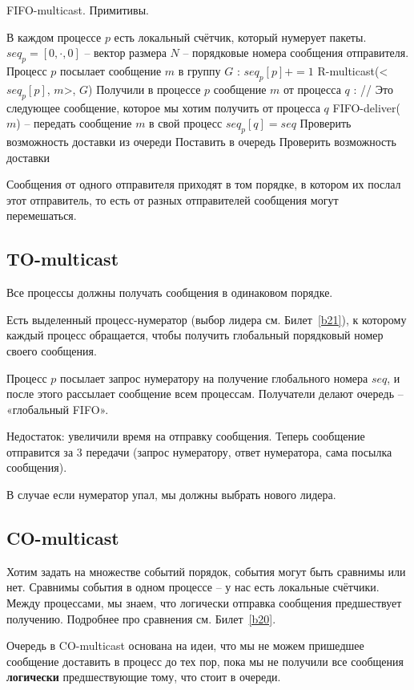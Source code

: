 \begin{algorithm}
\caption{FIFO-multicast. Примитивы.}
\begin{algorithmic}

\State В каждом процессе $p$ есть локальный счётчик, который нумерует пакеты.
\State $seq_p = [0, \cdot, 0]$ -- вектор размера $N$ -- порядковые номера сообщения отправителя.
\State
\State Процесс $p$ посылает сообщение $m$ в группу $G$
:
	\State $seq_p[p] += 1$
	\State R-multicast(<$seq_p[p]$, $m$>, $G$)
\EndProcedure
\State
\State Получили в процессе $p$ сообщение $m$ от процесса $q$
:
		\State // Это следующее сообщение, которое мы хотим получить от процесса $q$
		\State FIFO-deliver($m$) -- передать сообщение $m$ в свой процесс
		\State $seq_p[q] = seq$
		\State Проверить возможность доставки из очереди
	\Else
		\State Поставить в очередь
		\State Проверить возможность доставки
	\EndIf
\EndProcedure

\end{algorithmic}
\end{algorithm}

Сообщения от одного отправителя приходят в том порядке, в котором их послал этот отправитель, то есть от разных отправителей сообщения могут перемешаться.



\subsection*{TO-multicast}\label{b19:part4}

Все процессы должны получать сообщения в одинаковом порядке.

Есть выделенный процесс-нумератор (выбор лидера см. Билет~\ref{b21}), к которому каждый процесс обращается, чтобы получить глобальный порядковый номер своего сообщения.

Процесс $p$ посылает запрос нумератору на получение глобального номера $seq$, и после этого рассылает сообщение всем процессам. Получатели делают очередь -- «глобальный FIFO».

Недостаток: увеличили время на отправку сообщения. Теперь сообщение отправится за 3 передачи (запрос нумератору, ответ нумератора, сама посылка сообщения).

В случае если нумератор упал, мы должны выбрать нового лидера.


\subsection*{CO-multicast}\label{b19:part5}

Хотим задать на множестве событий порядок, события могут быть сравнимы или нет. Сравнимы события в одном процессе -- у нас есть локальные счётчики. Между процессами, мы знаем, что логически отправка сообщения предшествует получению. Подробнее про сравнения см. Билет~\ref{b20}.

Очередь в CO-multicast основана на идеи, что мы не можем пришедшее сообщение доставить в процесс до тех пор, пока мы не получили все сообщения \textbf{логически} предшествующие тому, что стоит в очереди.